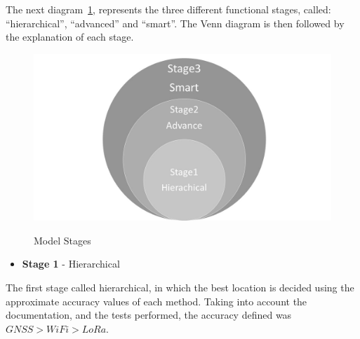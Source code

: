 The next diagram~\ref{fig:Stages}, represents the three different functional stages, called: “hierarchical”, “advanced” and “smart”. The Venn diagram is then followed by the explanation of each stage.

\begin{figure}[htbp]
  \centering
  
   {\includegraphics[width=0.55\linewidth]{Chapters/Figures/Stages.jpg}}
 
  \caption{Model Stages}
  \label{fig:Stages}
\end{figure}

\begin{itemize}
\item \textbf{Stage 1} - Hierarchical 
\end{itemize}


The first stage called hierarchical, in which the best location is decided using the approximate accuracy values of each method. Taking into account the documentation, and the tests performed, the accuracy defined was $GNSS > WiFi > LoRa$.

